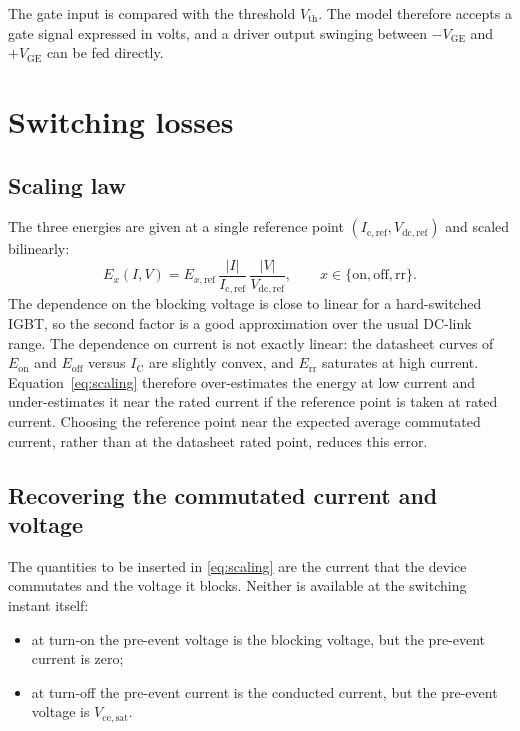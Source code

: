 \documentclass[11pt,a4paper]{article}
\begin{document}
The gate input is compared with the threshold $V_\mathrm{th}$. The model
therefore accepts a gate signal expressed in volts, and a driver output swinging
between $-V_\mathrm{GE}$ and $+V_\mathrm{GE}$ can be fed directly.

\section{Switching losses}

\subsection{Scaling law}

The three energies are given at a single reference point
$(I_\mathrm{c,ref}, V_\mathrm{dc,ref})$ and scaled bilinearly:
\begin{equation}
  E_x(I,V) = E_{x,\mathrm{ref}}\,
             \frac{|I|}{I_\mathrm{c,ref}}\,
             \frac{|V|}{V_\mathrm{dc,ref}},
  \qquad x \in \{\mathrm{on},\mathrm{off},\mathrm{rr}\}.
  \label{eq:scaling}
\end{equation}
The dependence on the blocking voltage is close to linear for a hard-switched
IGBT, so the second factor is a good approximation over the usual DC-link range.
The dependence on current is not exactly linear: the datasheet curves of
$E_\mathrm{on}$ and $E_\mathrm{off}$ versus $I_\mathrm{C}$ are slightly convex,
and $E_\mathrm{rr}$ saturates at high current. Equation~\eqref{eq:scaling}
therefore over-estimates the energy at low current and under-estimates it near
the rated current if the reference point is taken at rated current. Choosing the
reference point near the expected average commutated current, rather than at the
datasheet rated point, reduces this error.

\subsection{Recovering the commutated current and voltage}

The quantities to be inserted in \eqref{eq:scaling} are the current that the
device commutates and the voltage it blocks. Neither is available at the
switching instant itself:

\begin{itemize}
  \item at turn-on the pre-event voltage is the blocking voltage, but the
        pre-event current is zero;
  \item at turn-off the pre-event current is the conducted current, but the
        pre-event voltage is $V_\mathrm{ce,sat}$.
\end{itemize}
\end{document}
